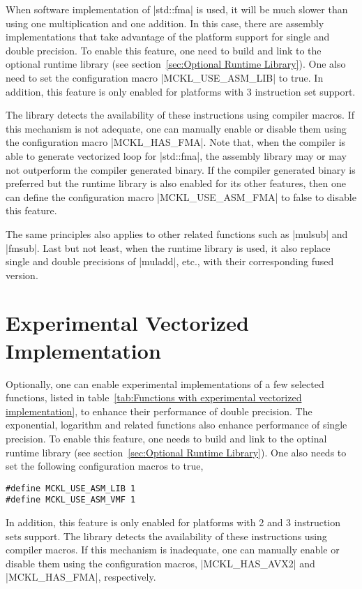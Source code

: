 When software implementation of |std::fma| is used, it will be much slower than
using one multiplication and one addition. In this case, there are assembly
implementations that take advantage of the platform support for single and
double precision. To enable this feature, one need to build and link to the
optional runtime library (see section~\ref{sec:Optional Runtime Library}). One
also need to set the configuration macro |MCKL_USE_ASM_LIB| to true. In
addition, this feature is only enabled for platforms with \fma{}3 instruction
set support.

The library detects the availability of these instructions using compiler
macros. If this mechanism is not adequate, one can manually enable or disable
them using the configuration macro |MCKL_HAS_FMA|. Note that, when the compiler
is able to generate vectorized loop for |std::fma|, the assembly library may or
may not outperform the compiler generated binary. If the compiler generated
binary is preferred but the runtime library is also enabled for its other
features, then one can define the configuration macro |MCKL_USE_ASM_FMA| to
false to disable this feature.

The same principles also applies to other related functions such as |mulsub|
and |fmsub|. Last but not least, when the runtime library is used, it also
replace single and double precisions of |muladd|, etc., with their
corresponding fused version.

\section{Experimental Vectorized Implementation}
\label{sec:Experimental Vectorized Implementation}

Optionally, one can enable experimental implementations of a few selected
functions, listed in table~\ref{tab:Functions with experimental vectorized
implementation}, to enhance their performance of double precision. The
exponential, logarithm and related functions also enhance performance of single
precision. To enable this feature, one needs to build and link to the optinal 
runtime library (see section~\ref{sec:Optional Runtime Library}). One also
needs to set the following configuration macros to true,
\begin{verbatim}
#define MCKL_USE_ASM_LIB 1
#define MCKL_USE_ASM_VMF 1
\end{verbatim}
In addition, this feature is only enabled for platforms with \avx{}2 and
\fma{}3 instruction sets support. The library detects the availability of these
instructions using compiler macros. If this mechanism is inadequate, one can
manually enable or disable them using the configuration macros, |MCKL_HAS_AVX2|
and |MCKL_HAS_FMA|, respectively.

